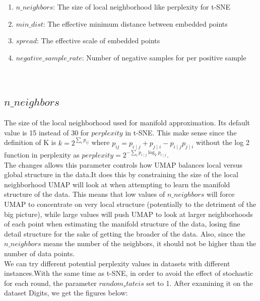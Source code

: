 \begin{enumerate}[1)]
\item $n\_neighbors$: The size of local neighborhood like perplexity for t-SNE
\item $min\_dist$: The effective minimum distance between embedded points
\item $spread$: The effective scale of embedded points
\item $negative\_sample\_rate$: Number of negative samples for per positive sample
\end{enumerate}\\

\subsection{$n\_neighbors$}

The size of the local neighborhood used for manifold approximation.  Its default value is 15 instead of 30 for $perplexity$ in t-SNE. This make sense since the definition of K is $k = 2^{\sum_i p_{ij}}$ where $p_{ij} = p_{i\mid j} + p_{j\mid i} - p_{i\mid j}p_{j\mid i}$ without the log 2 function in perplexity as $perplexity = 2^{-\sum_i p_{i \mid j} \log_2 p_{i \mid j} }$. \\

\noindent The changes allows this parameter controls how UMAP balances local versus global structure in the data.It does this by constraining the size of the local neighborhood UMAP will look at when attempting to learn the manifold structure of the data. This means that low values of $n\_neighbors$ will force UMAP to concentrate on very local structure (potentially to the detriment of the big picture), while large values will push UMAP to look at larger neighborhoods of each point when estimating the manifold structure of the data, losing fine detail structure for the sake of getting the broader of the data. Also, since the $n\_neighbors$ means the number of the neighbors, it should not be higher than the number of data points.\\

\noindent We can try different potential perplexity values in datasets with different instances.With the same time as t-SNE, in order to avoid the effect of stochastic for each round, the parameter $random_stateis$ set to 1. After examining it on the dataset Digits, we get the figures below:

